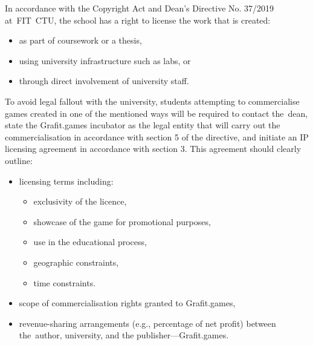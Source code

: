 In accordance with the Copyright Act and Dean’s Directive No. 37/2019 at~FIT~CTU, the school has a right to license the work that is created:
\begin{itemize}
    \item as part of coursework or a thesis,
    \item using university infrastructure such as labs, or
    \item through direct involvement of university staff. \cite{Kurzy_autorsky-zakon, FIT-smernice}
\end{itemize}
To avoid legal fallout with the university, students attempting to commercialise games created in one of the mentioned ways will be required to contact the~dean, state the Grafit.games incubator as the legal entity that will carry out the commercialisation in accordance with section 5 of the directive, and initiate an IP licensing agreement in accordance with section 3. This agreement should clearly outline:
\begin{itemize}
    \item licensing terms including:
    \begin{itemize}
        \item exclusivity of the licence,
        \item showcase of the game for promotional purposes,
        \item use in the educational process,
        \item geographic constraints,
        \item time constraints.
    \end{itemize}
    \item scope of commercialisation rights granted to Grafit.games,
    \item revenue-sharing arrangements (e.g., percentage of net profit) between the~author, university, and the publisher---Grafit.games. \cite{FIT-smernice}
\end{itemize}
